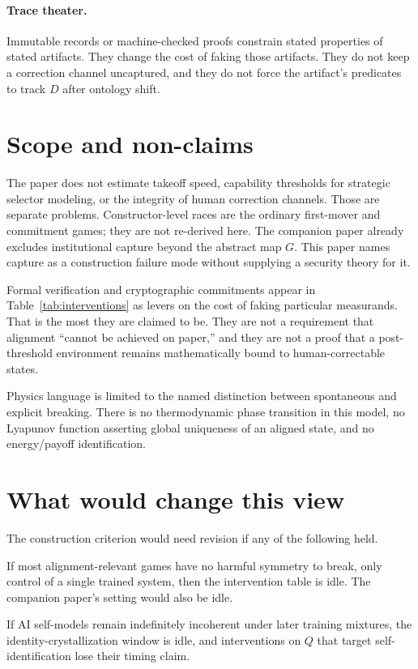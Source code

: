 \documentclass[11pt]{article}
\begin{document}
\paragraph{Trace theater.}
Immutable records or machine-checked proofs constrain stated properties of stated artifacts. They change the cost of faking those artifacts. They do not keep a correction channel uncaptured, and they do not force the artifact's predicates to track \(D\) after ontology shift.

\section{Scope and non-claims}

The paper does not estimate takeoff speed, capability thresholds for strategic selector modeling, or the integrity of human correction channels. Those are separate problems. Constructor-level races are the ordinary first-mover and commitment games; they are not re-derived here. The companion paper already excludes institutional capture beyond the abstract map \(G\). This paper names capture as a construction failure mode without supplying a security theory for it.

Formal verification and cryptographic commitments appear in Table~\ref{tab:interventions} as levers on the cost of faking particular measurands. That is the most they are claimed to be. They are not a requirement that alignment ``cannot be achieved on paper,'' and they are not a proof that a post-threshold environment remains mathematically bound to human-correctable states.

Physics language is limited to the named distinction between spontaneous and explicit breaking. There is no thermodynamic phase transition in this model, no Lyapunov function asserting global uniqueness of an aligned state, and no energy/payoff identification.

\section{What would change this view}

The construction criterion would need revision if any of the following held.

If most alignment-relevant games have no harmful symmetry to break, only control of a single trained system, then the intervention table is idle. The companion paper's setting would also be idle.

If AI self-models remain indefinitely incoherent under later training mixtures, the identity-crystallization window is idle, and interventions on \(Q\) that target self-identification lose their timing claim.
\end{document}
